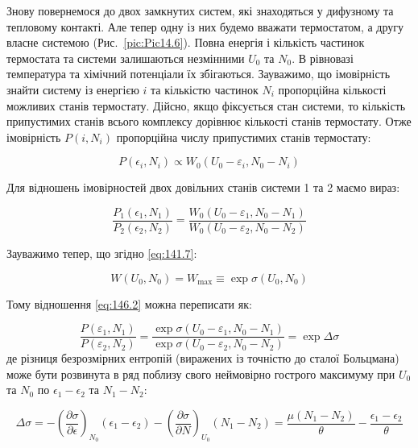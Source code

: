 Знову повернемося до двох замкнутих систем, які знаходяться у дифузному та тепловому контакті. Але тепер одну із них будемо вважати термостатом, а другу власне системою (Рис.~\ref{pic:Pic14.6}). Повна енергія і кількість частинок термостата та системи залишаються незмінними $U_0$ та $N_0$. В рівновазі температура та хімічний потенціали їх збігаються. Зауважимо, що імовірність знайти систему із енергією $i$ та кількістю частинок $N_i$ пропорційна кількості можливих станів термостату. Дійсно, якщо фіксується стан системи, то кількість припустимих станів всього комплексу дорівнює кількості станів термостату. Отже імовірність $P(i, N_i)$ пропорційна числу припустимих станів термостату:

\begin{equation}
	P(\epsilon_i, N_i) \propto W_0(U_0 - \varepsilon_i, N_0 - N_i)
	\label{eq:146.1}
\end{equation}

Для відношень імовірностей двох довільних станів системи 1 та 2 маємо вираз:

\begin{equation}
	\frac{P_1(\epsilon_1, N_1)}{P_2(\epsilon_2, N_2)} = \frac{W_0(U_0 - \varepsilon_1, N_0 - N_1)}{W_0(U_0 - \varepsilon_2, N_0 - N_2)}
	\label{eq:146.2}
\end{equation}

Зауважимо тепер, що згідно \eqref{eq:141.7}:

\begin{equation}
	W\left(U_0,N_0\right)=W_{\max}\equiv\exp{\sigma}\left(U_0,N_0\right)
	\label{eq:146.3}
\end{equation}

Тому відношення \eqref{eq:146.2} можна переписати як:

\begin{equation}
	\frac{P\left(\varepsilon_1,N_1\right)}{P\left(\varepsilon_2,N_2\right)}=\frac{\exp{\sigma\left(U_0-\varepsilon_1,N_0-N_1\right)}}{\exp{\sigma\left(U_0-\varepsilon_2,N_0-N_2\right)}}=\exp\Delta\sigma
	\label{eq:146.4}
\end{equation}
%
де різниця безрозмірних ентропій (виражених із точністю до сталої Больцмана) може бути розвинута в ряд поблизу свого неймовірно гострого максимуму при $U_0$ та $N_0$ по $\epsilon_1-\epsilon_2$ та $N_1 - N_2$:

\begin{equation}
	\Delta\sigma = -\left(\frac{\partial\sigma}{\partial\epsilon}\right)_{N_0} (\epsilon_1 - \epsilon_2) -
	\left(\frac{\partial\sigma}{\partial N}\right)_{U_0} (N_1 - N_2) = \frac{\mu(N_1 - N_2)}{\theta}
	- \frac{\epsilon_1 - \epsilon_2}{\theta}
	\label{eq:146.5}
\end{equation}

